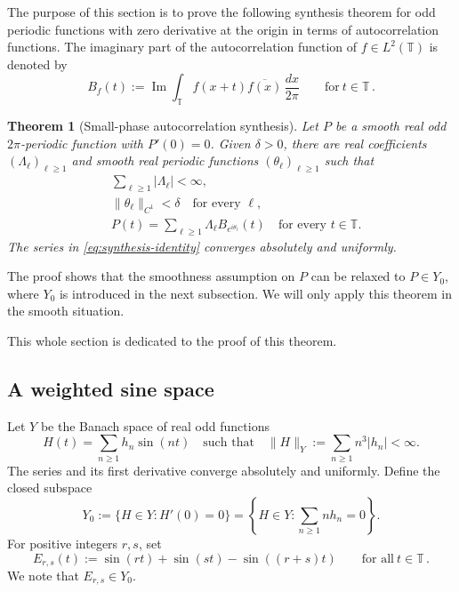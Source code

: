 \documentclass[11pt]{amsart}
\newtheorem{theorem}{Theorem}[section]
\theoremstyle{definition}
\theoremstyle{remark}
\newcommand{\T}{\mathbb T}
\begin{document}
The purpose of this section is to prove the following synthesis theorem for odd periodic functions with zero derivative at the origin in terms of autocorrelation functions. The imaginary part of the autocorrelation function of $f\in L^2(\T)$ is denoted by
\begin{equation}
    \label{eq:imag-autocorrelation}
    B_f(t) :=\operatorname{Im}\int_\T f(x+t)\overline{f(x)}\,\frac{dx}{2\pi} \qquad\text{for}\ t\in\T \,.
\end{equation}

\begin{theorem}[Small-phase autocorrelation synthesis]\label{thm:synthesis}
Let $P$ be a smooth real odd $2\pi$-periodic function with $P'(0)=0$.  Given $\delta>0$, there are real coefficients $(\Lambda_\ell)_{\ell\geq1}$ and smooth real periodic functions $(\theta_\ell)_{\ell\geq1}$ such that
\begin{align}
 &\sum_{\ell\geq1}|\Lambda_\ell|<\infty,\label{eq:synthesis-l1}\\
 &\|\theta_\ell\|_{C^1}<\delta
 \quad\text{for every }\ell,\label{eq:synthesis-small}\\
 &P(t)=\sum_{\ell\geq1}\Lambda_\ell
 B_{e^{i\theta_\ell}}(t)
 \quad\text{for every }t\in\T.\label{eq:synthesis-identity}
\end{align}
The series in \eqref{eq:synthesis-identity} converges absolutely and uniformly.
\end{theorem}

The proof shows that the smoothness assumption on $P$ can be relaxed to $P\in Y_0$, where $Y_0$ is introduced in the next subsection. We will only apply this theorem in the smooth situation.

This whole section is dedicated to the proof of this theorem.


\subsection{A weighted sine space}

Let $Y$ be the Banach space of real odd functions
\begin{equation}\label{eq:Y-definition}
 H(t)=\sum_{n\geq1}h_n\sin(nt)
 \quad\text{such that}\quad
 \|H\|_Y:=\sum_{n\geq1}n^3|h_n|<\infty.
\end{equation}
The series and its first derivative converge absolutely and uniformly.  Define the closed subspace
\begin{equation}\label{eq:Y0-definition}
 Y_0:=\{H\in Y:H'(0)=0\}
 =\left\{H\in Y:\sum_{n\geq1}nh_n=0
 \right\}.
\end{equation}
For positive integers $r,s$, set
\begin{equation}\label{eq:Ers}
 E_{r,s}(t):=\sin(rt)+\sin(st)-\sin((r+s)t)
 \qquad\text{for all}\ t\in\T \,.
\end{equation}
We note that $E_{r,s}\in Y_0$.
\end{document}
